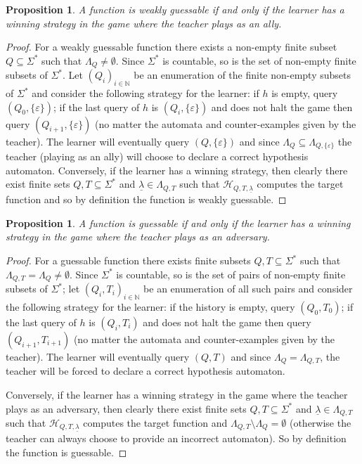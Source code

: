 \documentclass[10pt,a4paper]{amsart}
\newtheorem{prop}[thm]{Proposition}
\theoremstyle{definition}
\numberwithin{equation}{section}
\numberwithin{theorem}{section}
\begin{document}
\begin{prop}
A function is weakly guessable if and only if the learner has a winning strategy in the game where the teacher plays as an ally. 
\end{prop}



\begin{proof}
For a weakly guessable function there exists a non-empty finite subset $Q \subseteq \Sigma^*$ such that $\Lambda_{Q} \neq \emptyset$. Since $\Sigma^*$ is countable, so is the set of non-empty finite subsets of $\Sigma^*$. Let $(Q_i)_{i\in \mathbb{N}}$ be an enumeration of the finite non-empty subsets of $\Sigma^*$ and consider the following strategy for the learner: if $h$ is empty, query $(Q_0, \{\varepsilon\})$; if the last query of $h$ is $(Q_i, \{\varepsilon\})$ and does not halt the game then query $(Q_{i+1}, \{\varepsilon\})$ (no matter the automata and counter-examples given by the teacher). The learner will eventually query $(Q,\{\varepsilon\})$ and since $\Lambda_{Q} \subseteq \Lambda_{Q,\{\varepsilon\}}$ the teacher (playing as an ally) will choose to declare a correct hypothesis automaton. Conversely, if the learner has a winning strategy, then clearly there exist finite sets $Q, T \subseteq \Sigma^*$ and $\underline{\lambda} \in \Lambda_{Q, T}$ such that $\mathcal{H}_{Q, T, \underline{\lambda}}$ computes the target function and so by definition the function is weakly guessable.
\end{proof}



\begin{prop}
\label{prop:guessgame}A function is guessable if and only if the learner has a winning strategy in the game where the teacher plays as an adversary. 
\end{prop}



\begin{proof}
For a guessable function there exists finite subsets $Q, T \subseteq \Sigma^*$ such that $\Lambda_{Q,T} = \Lambda_{Q} \neq \emptyset$. Since $\Sigma^*$ is countable, so is the set of pairs of non-empty finite subsets of $\Sigma^*$; let $(Q_i, T_i)_{i\in \mathbb{N}}$ be an enumeration of all such pairs and consider the following strategy for the learner: if the history is empty, query  $(Q_0,T_0)$; if the last query of $h$ is $(Q_i, T_i)$ and does not halt the game then query $(Q_{i+1}, T_{i+1})$ (no matter the automata and counter-examples given by the teacher). The learner will eventually query $(Q,T)$ and since $\Lambda_{Q} = \Lambda_{Q,T}$, the teacher will be forced to declare a  correct hypothesis automaton.

Conversely, if the learner has a winning strategy in the game where the teacher plays as an adversary, then clearly there exist finite sets $Q, T \subseteq \Sigma^*$ and $\underline{\lambda} \in \Lambda_{Q, T}$ such that $\mathcal{H}_{Q, T, \underline{\lambda}}$ computes the target function and $\Lambda_{Q, T} \setminus \Lambda_Q = \emptyset$ (otherwise the teacher can always choose to provide an incorrect automaton). So by definition the function is guessable.
\end{proof}
\end{document}
